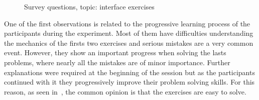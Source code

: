 \begin{figure}
  \centering
  \caption{Survey questions, topic: interface exercises}
\end{figure}

One of the first observations is related to the progressive learning
process of the participants during the experiment. Most of them have
difficulties understanding the mechanics of the firsts two exercises
and serious mistakes are a very common event. However, they show an
important progress when solving the lasts problems, where nearly all
the mistakes are of minor importance. Further explanations were
required at the beginning of the session but as the participants
continued with it they progressively improve their problem solving
skills. For this reason, as seen in~, the common
opinion is that the exercises are easy to solve.

